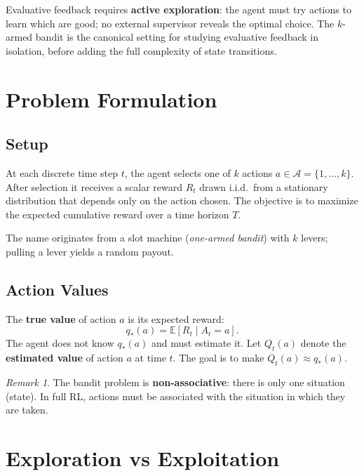 \documentclass[11pt,a4paper]{article}
\theoremstyle{definition}
\theoremstyle{plain}
\theoremstyle{remark}
\newtheorem*{remark}{Remark}
\begin{document}
Evaluative feedback requires \textbf{active exploration}: the agent must try actions to learn which are good; no external supervisor reveals the optimal choice. The $k$-armed bandit is the canonical setting for studying evaluative feedback in isolation, before adding the full complexity of state transitions.

\section{Problem Formulation}

\subsection{Setup}

\begin{tcolorbox}[colback=blue!5!white,colframe=blue!60!black,title=\textbf{$k$-Armed Bandit}]
At each discrete time step $t$, the agent selects one of $k$ actions $a \in \mathcal{A} = \{1, \ldots, k\}$. After selection it receives a scalar reward $R_t$ drawn i.i.d.\ from a stationary distribution that depends only on the action chosen. The objective is to maximize the expected cumulative reward over a time horizon $T$.
\end{tcolorbox}

The name originates from a slot machine (\emph{one-armed bandit}) with $k$ levers; pulling a lever yields a random payout.

\subsection{Action Values}

The \textbf{true value} of action $a$ is its expected reward:
\[
    q_*(a) = \mathbb{E}[R_t \mid A_t = a].
\]
The agent does not know $q_*(a)$ and must estimate it. Let $Q_t(a)$ denote the \textbf{estimated value} of action $a$ at time $t$. The goal is to make $Q_t(a) \approx q_*(a)$.

\begin{remark}
The bandit problem is \textbf{non-associative}: there is only one situation (state). In full RL, actions must be associated with the situation in which they are taken.
\end{remark}

\section{Exploration vs Exploitation}
\end{document}
